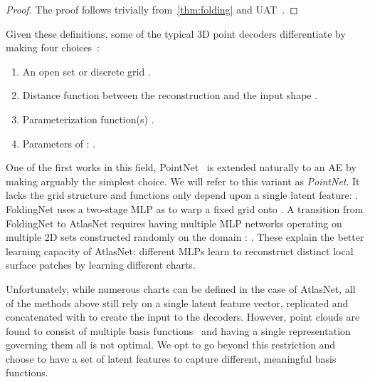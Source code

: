 \documentclass[10pt,twocolumn,letterpaper]{article}
\theoremstyle{break}
\begin{document}
\begin{proof}
The proof follows trivially from~\cref{thm:folding} and UAT~\cite{groueix2018}.
\end{proof}
Given these definitions, some of the typical 3D point decoders differentiate by making four choices~\cite{qi2017pointnet,groueix2018,Yang_2018_CVPR}:
\begin{enumerate}[itemsep=-1ex]
	\item An open set  or discrete grid .
	\item Distance function  between the reconstruction  and the input shape .
	\item Parameterization function(s) .
	\item Parameters  of : .
\end{enumerate}

One of the first works in this field, PointNet~\cite{qi2017pointnet} is extended naturally to an AE by~\cite{achlioptas2017latent_pc} making arguably the simplest choice. We will refer to this variant as \textit{PointNet}. It lacks the grid structure  and functions  only depend upon a single latent feature: . FoldingNet uses a two-stage MLP as  to warp a fixed grid  onto . A transition from FoldingNet to AtlasNet requires having multiple MLP networks operating on multiple 2D sets  constructed randomly on the domain : . These explain the better learning capacity of AtlasNet: different MLPs learn to reconstruct distinct local surface patches by learning different charts.

Unfortunately, while numerous charts can be defined in the case of AtlasNet, all of the methods above still rely on a single latent feature vector, replicated and concatenated with  to create the input to the decoders. However, point clouds are found to consist of multiple basis functions~\cite{Sung2018} and having a single representation governing them all is not optimal. We opt to go beyond this restriction and choose to have a set of latent features  to capture different, meaningful basis functions. 
\end{document}

